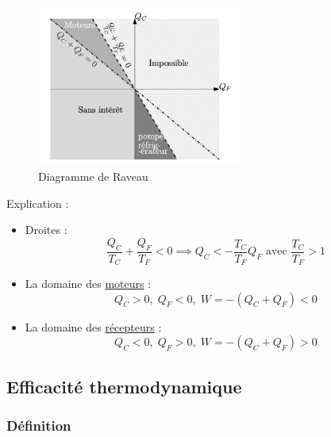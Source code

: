 \begin{figure}[H] %
  \centering
  \includegraphics[width=0.6\textwidth]{./assets/Diagramme de Raveau.png}
  \caption{Diagramme de Raveau}
  \label{fig:Diagramme de Raveau}
\end{figure}

Explication : 
\begin{itemize}

    \item Droites :
      \begin{equation}
        \frac{Q_C}{T_C}  + \frac{Q_F}{T_F}  < 0 \implies Q_C < - \frac{T_C}{ T_F}  Q_F \text{ avec } \frac{T_C}{T_F}  > 1
      \end{equation}

    \item La domaine des \underline{moteurs} : 
      \begin{equation}
        Q_C > 0, \; Q_F < 0 ,\; W = - (Q_C + Q_F) < 0
      \end{equation}

    \item La domaine des \underline{récepteurs} : 
      \begin{equation}
        Q_C < 0, \; Q_F > 0, \; W = - (Q_C + Q_F) > 0
      \end{equation} 

\end{itemize}


\subsection{Efficacité thermodynamique} %
\label{sub:Efficacité thermodynamique}

\subsubsection{Définition} %
\label{sec:Définition}

